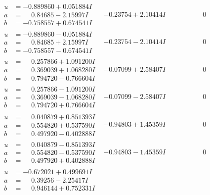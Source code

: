 \documentclass[1p]{elsarticle_modified}
\theoremstyle{definition}
\begin{document}
$$\begin{array}{c|c|c}
\begin{aligned}
u &= -0.889860 + 0.051884 I \\
a &= \phantom{-}0.84685 - 2.15997 I \\
b &= -0.758557 + 0.674541 I\end{aligned}
 & -0.23754 + 2.10414 I & \phantom{-0.000000 } 0 \\ \hline\begin{aligned}
u &= -0.889860 - 0.051884 I \\
a &= \phantom{-}0.84685 + 2.15997 I \\
b &= -0.758557 - 0.674541 I\end{aligned}
 & -0.23754 - 2.10414 I & \phantom{-0.000000 } 0 \\ \hline\begin{aligned}
u &= \phantom{-}0.257866 + 1.091200 I \\
a &= \phantom{-}0.369039 + 1.068280 I \\
b &= \phantom{-}0.794720 - 0.766604 I\end{aligned}
 & -0.07099 + 2.58407 I & \phantom{-0.000000 } 0 \\ \hline\begin{aligned}
u &= \phantom{-}0.257866 - 1.091200 I \\
a &= \phantom{-}0.369039 - 1.068280 I \\
b &= \phantom{-}0.794720 + 0.766604 I\end{aligned}
 & -0.07099 - 2.58407 I & \phantom{-0.000000 } 0 \\ \hline\begin{aligned}
u &= \phantom{-}0.040879 + 0.851393 I \\
a &= \phantom{-}0.554820 + 0.537590 I \\
b &= \phantom{-}0.497920 - 0.402888 I\end{aligned}
 & -0.94803 + 1.45359 I & \phantom{-0.000000 } 0 \\ \hline\begin{aligned}
u &= \phantom{-}0.040879 - 0.851393 I \\
a &= \phantom{-}0.554820 - 0.537590 I \\
b &= \phantom{-}0.497920 + 0.402888 I\end{aligned}
 & -0.94803 - 1.45359 I & \phantom{-0.000000 } 0 \\ \hline\begin{aligned}
u &= -0.672021 + 0.499691 I \\
a &= \phantom{-}0.39256 - 2.25417 I \\
b &= \phantom{-}0.946144 + 0.752331 I\end{aligned}

\end{array}$$
\end{document}
